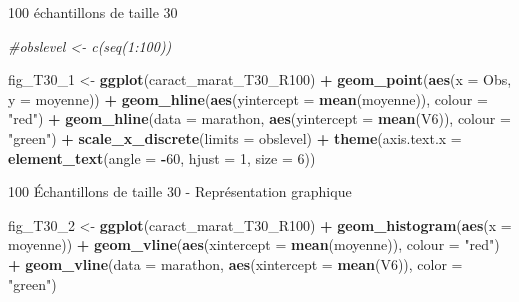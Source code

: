 \documentclass[ignorenonframetext,]{beamer}
\newenvironment{Shaded}{\begin{snugshade}}{\end{snugshade}}
\newcommand{\KeywordTok}[1]{\textcolor[rgb]{0.13,0.29,0.53}{\textbf{#1}}}
\newcommand{\DataTypeTok}[1]{\textcolor[rgb]{0.13,0.29,0.53}{#1}}
\newcommand{\DecValTok}[1]{\textcolor[rgb]{0.00,0.00,0.81}{#1}}
\newcommand{\StringTok}[1]{\textcolor[rgb]{0.31,0.60,0.02}{#1}}
\newcommand{\CommentTok}[1]{\textcolor[rgb]{0.56,0.35,0.01}{\textit{#1}}}
\newcommand{\OperatorTok}[1]{\textcolor[rgb]{0.81,0.36,0.00}{\textbf{#1}}}
\newcommand{\NormalTok}[1]{#1}
\begin{document}
\begin{frame}[fragile]{100 échantillons de taille 30}

\begin{Shaded}
\begin{Highlighting}[]
\CommentTok{#obslevel <- c(seq(1:100))}

\NormalTok{fig_T30_}\DecValTok{1}\NormalTok{ <-}\StringTok{ }
\StringTok{  }\KeywordTok{ggplot}\NormalTok{(caract_marat_T30_R100) }\OperatorTok{+}
\StringTok{  }\KeywordTok{geom_point}\NormalTok{(}\KeywordTok{aes}\NormalTok{(}\DataTypeTok{x =}\NormalTok{ Obs, }\DataTypeTok{y =}\NormalTok{ moyenne)) }\OperatorTok{+}
\StringTok{  }\KeywordTok{geom_hline}\NormalTok{(}\KeywordTok{aes}\NormalTok{(}\DataTypeTok{yintercept =} \KeywordTok{mean}\NormalTok{(moyenne)), }\DataTypeTok{colour =} \StringTok{"red"}\NormalTok{) }\OperatorTok{+}
\StringTok{  }\KeywordTok{geom_hline}\NormalTok{(}\DataTypeTok{data =}\NormalTok{ marathon, }\KeywordTok{aes}\NormalTok{(}\DataTypeTok{yintercept =} \KeywordTok{mean}\NormalTok{(V6)), }\DataTypeTok{colour =} \StringTok{"green"}\NormalTok{) }\OperatorTok{+}
\StringTok{  }\KeywordTok{scale_x_discrete}\NormalTok{(}\DataTypeTok{limits =}\NormalTok{ obslevel) }\OperatorTok{+}
\StringTok{  }\KeywordTok{theme}\NormalTok{(}\DataTypeTok{axis.text.x =} \KeywordTok{element_text}\NormalTok{(}\DataTypeTok{angle =} \OperatorTok{-}\DecValTok{60}\NormalTok{, }\DataTypeTok{hjust =} \DecValTok{1}\NormalTok{, }\DataTypeTok{size =} \DecValTok{6}\NormalTok{))}
\end{Highlighting}
\end{Shaded}

\end{frame}

\begin{frame}[fragile]{100 Échantillons de taille 30 - Représentation
graphique}

\begin{Shaded}
\begin{Highlighting}[]
\NormalTok{fig_T30_}\DecValTok{2}\NormalTok{ <-}\StringTok{ }
\StringTok{  }\KeywordTok{ggplot}\NormalTok{(caract_marat_T30_R100) }\OperatorTok{+}
\StringTok{  }\KeywordTok{geom_histogram}\NormalTok{(}\KeywordTok{aes}\NormalTok{(}\DataTypeTok{x =}\NormalTok{ moyenne)) }\OperatorTok{+}
\StringTok{  }\KeywordTok{geom_vline}\NormalTok{(}\KeywordTok{aes}\NormalTok{(}\DataTypeTok{xintercept =} \KeywordTok{mean}\NormalTok{(moyenne)), }\DataTypeTok{colour =} \StringTok{"red"}\NormalTok{) }\OperatorTok{+}
\StringTok{  }\KeywordTok{geom_vline}\NormalTok{(}\DataTypeTok{data =}\NormalTok{ marathon, }\KeywordTok{aes}\NormalTok{(}\DataTypeTok{xintercept =} \KeywordTok{mean}\NormalTok{(V6)), }\DataTypeTok{color =} \StringTok{"green"}\NormalTok{)}
\end{Highlighting}
\end{Shaded}

\end{frame}
\end{document}
